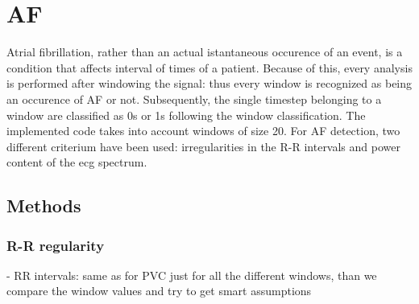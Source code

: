 \documentclass[a4paper,titlepage]{article}
\begin{document}
\begin{figure}[h!]

\hspace*{-\dimexpr\oddsidemargin+1in\relax}\hspace*{-\paperwidth}
\end{figure}

\clearpage


\section{AF}
Atrial fibrillation, rather than an actual istantaneous occurence of an event, is a condition that affects interval of times of a patient.
Because of this, every analysis is performed after windowing the signal: thus every window is recognized as being an occurence of AF or not. Subsequently, the single timestep belonging to a window are classified as 0s or 1s following the window classification.
The implemented code takes into account windows of size 20.
For AF detection, two different criterium have been used: irregularities in the R-R intervals and power content of the ecg spectrum.
\subsection{Methods}
\subsubsection{R-R regularity}
- RR intervals: same as for PVC just for all the different windows, than we compare the window values and try to get smart assumptions
\end{document}
